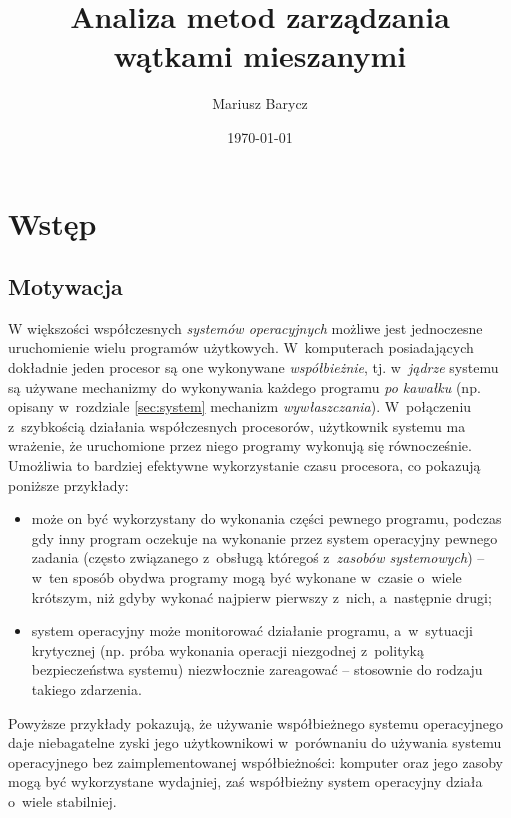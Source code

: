 \documentclass[12pt]{mwart}
\author{Mariusz Barycz}
\title{Analiza metod zarządzania wątkami mieszanymi}
\date{\today}
\begin{document}
 


\maketitle
\thispagestyle{empty}

\newpage
\tableofcontents
\thispagestyle{empty}
\newpage

\section{Wstęp}
%
\subsection{Motywacja}
\label{sec:motivation}
\indent
  W większości współczesnych \emph{systemów operacyjnych} możliwe jest jednoczesne uruchomienie wielu
  programów użytkowych. W~komputerach posiadających dokładnie jeden procesor są one wykonywane \emph{współbieżnie}, tj. w~\emph{jądrze} systemu są używane mechanizmy do
  wykonywania każdego programu \emph{po kawałku} (np. opisany w~rozdziale \ref{sec:system} mechanizm \emph{wywłaszczania}). W~połączeniu
  z~szybkością działania współczesnych procesorów, użytkownik systemu ma wrażenie, że uruchomione przez niego programy wykonują się równocześnie.
  Umożliwia to bardziej efektywne wykorzystanie czasu procesora, co pokazują poniższe przykłady:
  \begin{itemize}
    \item może on być wykorzystany do wykonania części pewnego programu,
      podczas gdy inny program oczekuje na wykonanie przez system operacyjny pewnego zadania (często związanego z~obsługą któregoś z~\emph{zasobów systemowych}) --
      w~ten sposób obydwa programy mogą być wykonane w~czasie o~wiele krótszym, niż gdyby wykonać najpierw pierwszy z~nich, a~następnie drugi;
    \item system operacyjny może monitorować działanie programu, a~w~sytuacji krytycznej (np. próba wykonania operacji niezgodnej z~polityką bezpieczeństwa systemu)
      niezwłocznie zareagować -- stosownie do rodzaju takiego zdarzenia.
  \end{itemize}
  Powyższe przykłady pokazują, że używanie współbieżnego systemu operacyjnego daje niebagatelne zyski jego użytkownikowi w~porównaniu do używania systemu operacyjnego
  bez zaimplementowanej współbieżności: komputer oraz jego zasoby mogą być wykorzystane wydajniej, zaś współbieżny system operacyjny działa o~wiele stabilniej.
\par
\end{document}
